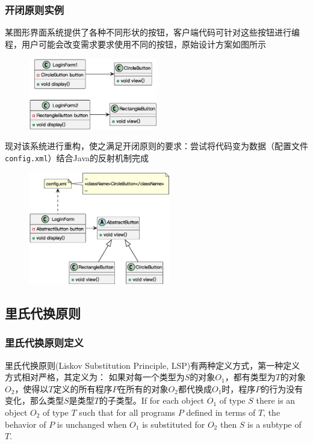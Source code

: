 \subsubsection{开闭原则实例}
某图形界面系统提供了各种不同形状的按钮，客户端代码可针对这些按钮进行编程，用户可能会改变需求要求使用不同的按钮，原始设计方案如图所示
\begin{figure}[H]
    \vspace{-0.5em}
	\centering
	\includegraphics[width=0.5\textwidth]{images/开闭原则实例1.eps}
    \vspace{-1em}
\end{figure}

现对该系统进行重构，使之满足开闭原则的要求：尝试将代码变为数据（配置文件\;\verb|config.xml|）结合Java的反射机制完成
\begin{figure}[H]
    \vspace{-0.5em}
	\centering
	\includegraphics[width=0.55\textwidth]{images/开闭原则实例2.eps}
    \vspace{-1em}
\end{figure}

\subsection{里氏代换原则}

\subsubsection{里氏代换原则定义}
里氏代换原则(Liskov Substitution Principle, LSP)有两种定义方式，第一种定义方式相对严格，其定义为：
如果对每一个类型为$S$的对象$O_1$，都有类型为$T$的对象$O_2$，使得以$T$定义的所有程序$P$在所有的对象$O_2$都代换成$O_1$时，程序$P$的行为没有变化，那么类型$S$是类型$T$的子类型。If for each object $O_1$ of type $S$ there is an object $O_2$ of type $T$ such that for all programs $P$ defined in terms of $T$, the behavior of $P$ is unchanged when $O_1$ is substituted for $O_2$ then $S$ is a subtype of $T$.

